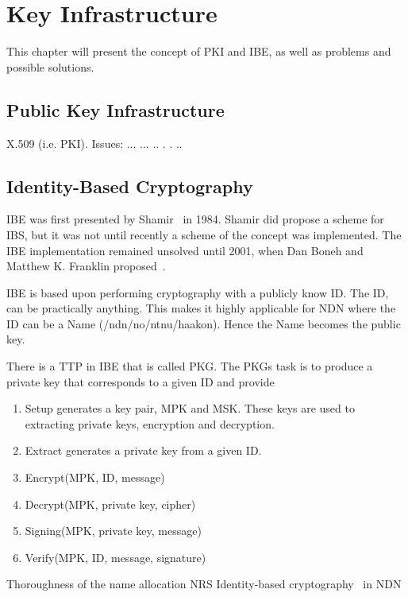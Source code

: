 \chapter{Key Infrastructure}
This chapter will present the concept of \gls{PKI} and \gls{IBE}, as well as problems and possible solutions. 

\section{Public Key Infrastructure}

X.509 (i.e. \gls{PKI}). Issues: ... ... .. . . ..

\section{Identity-Based Cryptography}\label{ibc}
\gls{IBE} was first presented by Shamir~\cite{DBLP:conf/crypto/Shamir84} in 1984. 
Shamir did propose a scheme for \gls{IBS}, but it was not until recently a scheme of the concept was implemented. 
The \gls{IBE} implementation remained unsolved until 2001, when Dan Boneh and Matthew K. Franklin proposed~\cite{DBLP:conf/crypto/BonehF01}.

\gls{IBE} is based upon performing cryptography with a publicly know ID.
The ID, can be practically anything.
This makes it highly applicable for \gls{NDN} where the ID can be a Name (/ndn/no/ntnu/haakon).
Hence the Name becomes the public key. 

There is a \gls{TTP} in \gls{IBE} that is called \gls{PKG}.
The \gls{PKG}s task is to produce a private key that corresponds to a given ID and provide 

\begin{enumerate}
  \item Setup generates a key pair, \gls{MPK} and \gls{MSK}. These keys are used to extracting private keys, encryption and decryption.
  \item Extract generates a private key from a given ID. 
  \item Encrypt(\gls{MPK}, ID, message)
  \item Decrypt(\gls{MPK}, private key, cipher)
  \item Signing(\gls{MPK}, private key, message)
  \item Verify(\gls{MPK}, ID, message, signature)
\end{enumerate}


Thoroughness of the name allocation \gls{NRS} 
Identity-based cryptography~\cite{DBLP:conf/icnp/ZhangCXWSW11} in \gls{NDN}

